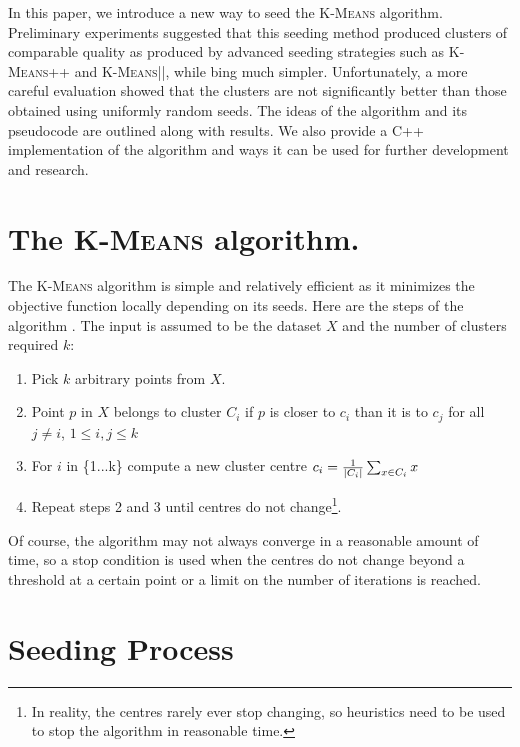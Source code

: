\documentclass[12pt]{dalthesis}
\newcommand*{\kmeansn}{\textsc{K-Means}} %
\newcommand*{\kmeans}{\textsc{K-Means} } %
\DeclarePairedDelimiter\abs{\lvert}{\rvert}
\begin{document}
In this paper, we introduce a new way to seed the \kmeans algorithm. Preliminary experiments suggested that this seeding method produced clusters of comparable quality as produced by advanced seeding strategies such as \kmeansn++ and \kmeansn||, while bing much simpler. Unfortunately, a more careful evaluation showed that the clusters are not significantly better than those obtained using uniformly random seeds. The ideas of the algorithm and its pseudocode are outlined along with results. We also provide a C++ implementation of the algorithm and ways it can be used for further development and research.


\section{The \kmeans algorithm.}
The \kmeans algorithm is simple and relatively efficient as it minimizes the objective function locally depending on its seeds.
Here are the steps of the algorithm \citep{arthur2007k}. The input is assumed to be the dataset $X$ and the number of clusters required $k$:

\begin{enumerate}
  \item Pick $k$ arbitrary points from $X$.
  \item Point $p$ in $X$ belongs to cluster $C_i$ if $p$ is closer to $c_i$ than it is to $c_j$ for all $j \neq i$, $1 \leq i,j \leq k$
  \item For $i$ in \{1...k\} compute a new cluster centre $c_i = \frac{1}{\abs{C_i}}\sum_{x \in C_i}x$
  \item Repeat steps 2 and 3 until centres do not change\footnote{In reality, the centres rarely ever stop changing, so heuristics need to be used to stop the algorithm in reasonable time.}.
\end{enumerate}

Of course, the algorithm may not always converge in a reasonable amount of time, so a stop condition is used when the centres do not change beyond a threshold at a certain point or a limit on the number of iterations is reached.

\section{Seeding Process}
\end{document}
